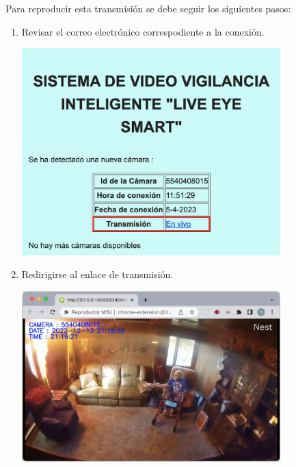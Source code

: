 Para reproducir esta transmisión se debe seguir los siguientes pasos:
\begin{enumerate}
    \item Revisar el correo electrónico correspodiente a la conexión.
    \begin{center}
        \includegraphics[width=10cm]{img/anexos/link.png}
    \end{center}
    \item Redirigirse al enlace de transmisión.
    \begin{center}
        \includegraphics[width=10cm]{img/anexos/stream_web.png}
    \end{center}
\end{enumerate}